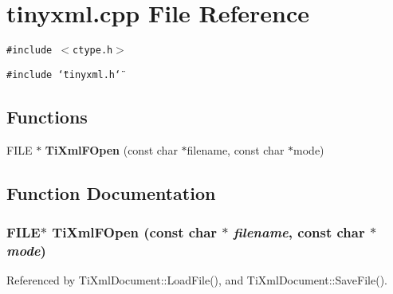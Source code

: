 \section{tinyxml.cpp File Reference}
\label{tinyxml_8cpp}


{\tt \#include $<$ctype.h$>$}\par
{\tt \#include \char`\"{}tinyxml.h\char`\"{}}\par
\subsection*{Functions}
\begin{CompactItemize}
\item 
FILE $\ast$ {\bf TiXmlFOpen} (const char $\ast$filename, const char $\ast$mode)
\end{CompactItemize}


\subsection{Function Documentation}
\subsubsection[TiXmlFOpen]{\setlength{\rightskip}{0pt plus 5cm}FILE$\ast$ TiXmlFOpen (const char $\ast$ {\em filename}, \/  const char $\ast$ {\em mode})}\label{tinyxml_8cpp_72fac93bfb73cb50c2bfb3f9c8520557}




Referenced by TiXmlDocument::LoadFile(), and TiXmlDocument::SaveFile().